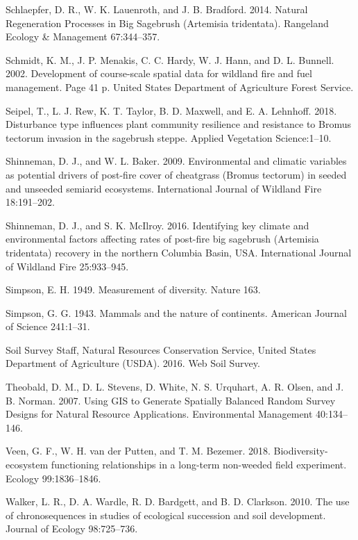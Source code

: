 \documentclass[12pt,]{article}
\begin{document}
\hypertarget{ref-Schlaepfer2014}{}
Schlaepfer, D. R., W. K. Lauenroth, and J. B. Bradford. 2014. Natural
Regeneration Processes in Big Sagebrush (Artemisia tridentata).
Rangeland Ecology \& Management 67:344--357.

\hypertarget{ref-Schmidt2002}{}
Schmidt, K. M., J. P. Menakis, C. C. Hardy, W. J. Hann, and D. L.
Bunnell. 2002. Development of course-scale spatial data for wildland
fire and fuel management. Page 41 p. United States Department of
Agriculture Forest Service.

\hypertarget{ref-Seipel2018}{}
Seipel, T., L. J. Rew, K. T. Taylor, B. D. Maxwell, and E. A. Lehnhoff.
2018. Disturbance type influences plant community resilience and
resistance to Bromus tectorum invasion in the sagebrush steppe. Applied
Vegetation Science:1--10.

\hypertarget{ref-Shinneman2009}{}
Shinneman, D. J., and W. L. Baker. 2009. Environmental and climatic
variables as potential drivers of post-fire cover of cheatgrass (Bromus
tectorum) in seeded and unseeded semiarid ecosystems. International
Journal of Wildland Fire 18:191--202.

\hypertarget{ref-Shinneman2016}{}
Shinneman, D. J., and S. K. McIlroy. 2016. Identifying key climate and
environmental factors affecting rates of post-fire big sagebrush
(Artemisia tridentata) recovery in the northern Columbia Basin, USA.
International Journal of Wildland Fire 25:933--945.

\hypertarget{ref-Simpson1949}{}
Simpson, E. H. 1949. Measurement of diversity. Nature 163.

\hypertarget{ref-Simpson1943}{}
Simpson, G. G. 1943. Mammals and the nature of continents. American
Journal of Science 241:1--31.

\hypertarget{ref-wss2016}{}
Soil Survey Staff, Natural Resources Conservation Service, United States
Department of Agriculture (USDA). 2016. Web Soil Survey.

\hypertarget{ref-Theobald2007}{}
Theobald, D. M., D. L. Stevens, D. White, N. S. Urquhart, A. R. Olsen,
and J. B. Norman. 2007. Using GIS to Generate Spatially Balanced Random
Survey Designs for Natural Resource Applications. Environmental
Management 40:134--146.

\hypertarget{ref-Veen2018}{}
Veen, G. F., W. H. van der Putten, and T. M. Bezemer. 2018.
Biodiversity-ecosystem functioning relationships in a long-term
non-weeded field experiment. Ecology 99:1836--1846.

\hypertarget{ref-Walker2010}{}
Walker, L. R., D. A. Wardle, R. D. Bardgett, and B. D. Clarkson. 2010.
The use of chronosequences in studies of ecological succession and soil
development. Journal of Ecology 98:725--736.
\end{document}
